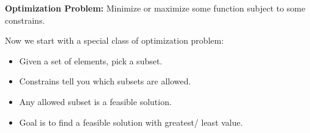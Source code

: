 
\begin{definition}
\textbf{Optimization Problem:} Minimize or maximize some function subject to 
some constrains.
\end{definition}



Now we start with a special class of optimization problem:

\begin{itemize}
 \item Given a set of elements, pick a subset.
 \item Constrains tell you which subsets are allowed.
 \item Any allowed subset is a feasible solution.
 \item Goal is to find a feasible solution with greatest/ least value.
\end{itemize}
